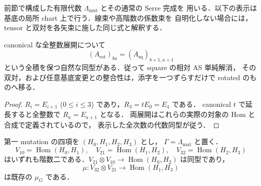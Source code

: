 前節で構成した有限代数 $\Lambda_{\mathrm{mut}}$ とその通常の Serre 完成を
用いる．以下の表示は基底の局所 chart 上で行う．線束や高階数の係数束を
自明化しない場合には，tensor と双対を各矢束に施した同じ式と解釈する．

\begin{proposition}[rotated展開は実際の添字移動]
\label{prop:qa-relative-rotated-index-shift}
canonical な全整数展開について
\[
 (A_{\mathrm{rot}})_{ba}=(A_{\mathrm{sq}})_{b+1,a+1}
\]
という全積を保つ自然な同型がある．従って square の相対 AS 単純解消，
その双対，および任意基底変更との整合性は，添字を一つずらすだけで
rotated のものへ移る．
\end{proposition}
\begin{proof}
$R_i=E_{i+1}$ ($0\leq i\leq3$) であり，$R_3=tE_0=E_4$ である．
canonical $t$ で延長すると全整数で $R_a=E_{a+1}$ となる．
両展開はこれらの実際の対象の Hom と合成で定義されているので，
表示した全次数の代数同型が従う．
\end{proof}

第一 mutation の四項を $(H_0,H_1,H_2,H_3)$ とし，
$\Gamma=\Lambda_{\mathrm{mut}}$ と置く．
\[
 V_{10}=\operatorname{Hom}(H_0,H_1),\quad
 V_{21}=\operatorname{Hom}(H_1,H_2),\quad
 V_{32}=\operatorname{Hom}(H_2,H_3)
\]
はいずれも階数二である．$V_{21}\otimes V_{10}\to\operatorname{Hom}(H_0,H_2)$
は同型であり，
\[
 \mu:V_{32}\otimes V_{21}\longrightarrow\operatorname{Hom}(H_1,H_3)
\]
は既存の $\mu_G$ である．

